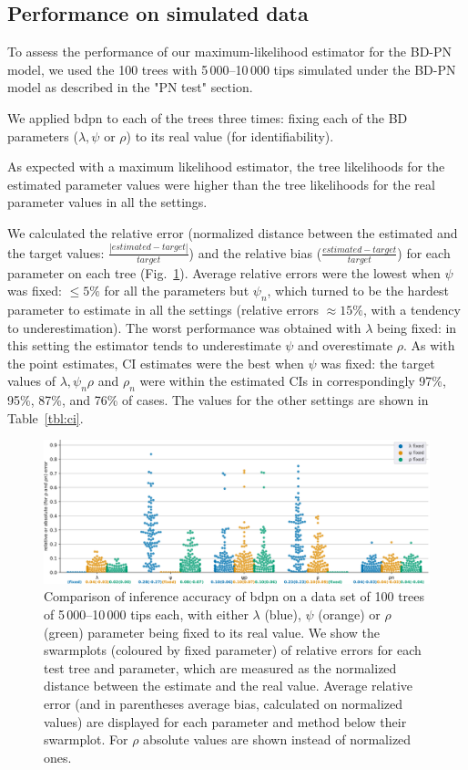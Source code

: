 \documentclass[a4paper,10pt]{article}
\begin{document}
\subsection{Performance on simulated data}

To assess the performance of our maximum-likelihood estimator for the BD-PN model, we used the 100 trees with 5\,000--10\,000 tips simulated under the BD-PN model as described in the "PN test" section.

We applied bdpn to each of the trees three times: fixing each of the BD parameters ($\lambda,\psi$ or $\rho$) to its real value (for identifiability). 


As expected with a maximum likelihood estimator, the tree likelihoods for the estimated parameter values were higher than the tree likelihoods for the real parameter values in all the settings.

We calculated the relative error (normalized distance between the estimated and the target values: $\frac{|estimated - target|}{target}$) and the relative bias ($\frac{estimated - target}{target}$) for each parameter on each tree (Fig.~\ref{fig:sim}). 
Average relative errors were the lowest when $\psi$ was fixed: $\leq 5\%$  for all the parameters but $\psi_n$, which turned to be the hardest parameter to estimate in all the settings (relative errors $\approx 15\%$, with a tendency to underestimation). 
The worst performance was obtained with $\lambda$ being fixed: in this setting the estimator tends to underestimate $\psi$ and overestimate $\rho$.
As with the point estimates, CI estimates were the best when $\psi$ was fixed: the target values of $\lambda, \psi_{n} \rho$ and $\rho_n$ were within the estimated CIs in correspondingly 97\%, 95\%, 87\%, and 76\% of cases. The values for the other settings are shown in Table~\ref{tbl:ci}.

\begin{figure}[!pht]
\centering 
\includegraphics[width=1\textwidth]{Fig_errors.eps}
\caption{Comparison of inference accuracy of bdpn on a data set of 100 trees of 5\,000--10\,000 tips each, with either $\lambda$ (blue), $\psi$ (orange) or $\rho$ (green) parameter being fixed to its real value.
We show the swarmplots (coloured by fixed parameter) of relative errors for each test tree and parameter, which are measured as the normalized distance between the estimate and the real value. Average relative error (and in parentheses average bias, calculated on normalized values) are displayed for each parameter and method below their swarmplot. For $\rho$ absolute values are shown instead of normalized ones. } 
\label{fig:sim} 
\end{figure}
 
\end{document}
